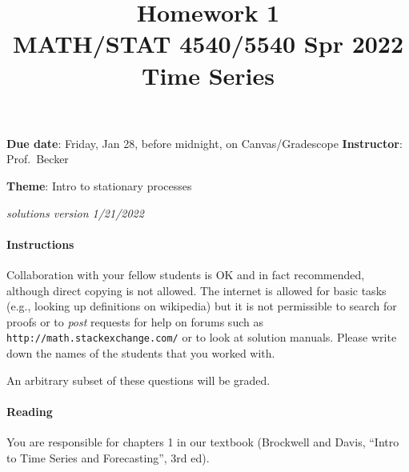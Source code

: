 \documentclass[10pt, letterpaper]{scrartcl}
\title{Homework 1 \solTitle{Selected Solutions} \\MATH/STAT 4540/5540 Spr 2022 Time Series}
\date{}
\newenvironment{instructions}{}{}
\newenvironment{SolnComment}{}{}
\begin{document}
\maketitle
\vspace{-6em}
\textbf{\sffamily Due date}: Friday, Jan 28, before midnight, on Canvas/Gradescope
\hfill \textbf{\sffamily Instructor}: Prof.\ Becker

\textbf{\sffamily Theme}: Intro to stationary processes

\begin{SolnComment}
    \hfill {\em \small    solutions version 1/21/2022}
\end{SolnComment}

\begin{instructions} %
\paragraph{Instructions} 
Collaboration with your fellow students is OK and in fact recommended, although direct copying is not allowed. The internet is allowed for basic tasks (e.g., looking up definitions on wikipedia) but it is not permissible to search for proofs or to \emph{post} requests for help on forums such as \texttt{http://math.stackexchange.com/} or to look at solution manuals. Please write down the names of the students that you worked with.

An arbitrary subset of these questions will be graded.
\vspace{-1em}
\paragraph{Reading} 
You are responsible for chapters 1 in our textbook (Brockwell and Davis, ``Intro to Time Series and Forecasting'', 3rd ed).
\end{instructions}
\end{document}
